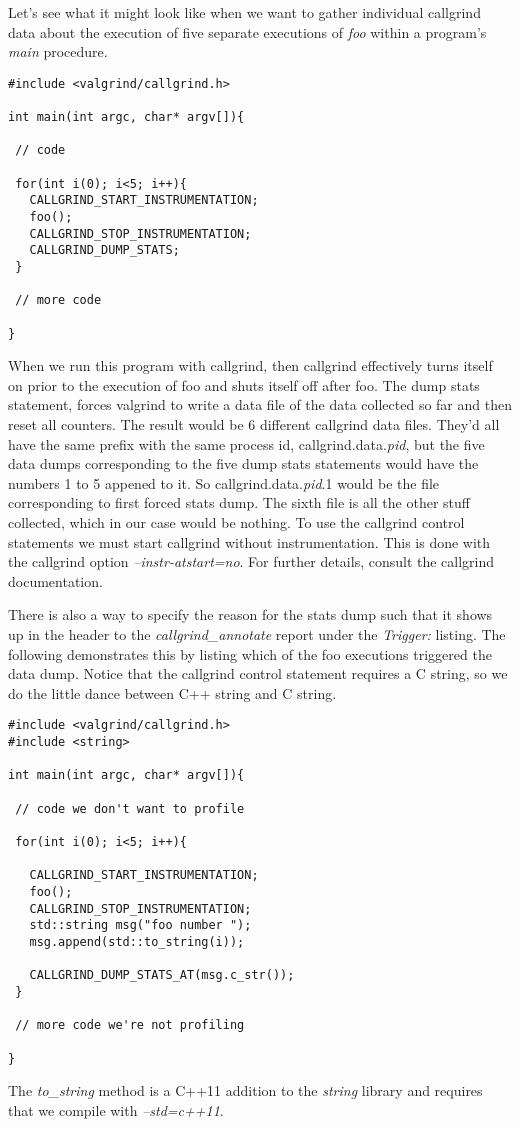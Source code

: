 \documentclass[]{tufte-handout}
\begin{document}
Let's see what it might look like when we want to gather individual callgrind data about the execution of five separate executions of \textit{foo} within a program's \textit{main} procedure.
\begin{verbatim}
#include <valgrind/callgrind.h>

int main(int argc, char* argv[]){
 
 // code
 
 for(int i(0); i<5; i++){
   CALLGRIND_START_INSTRUMENTATION;
   foo();
   CALLGRIND_STOP_INSTRUMENTATION;
   CALLGRIND_DUMP_STATS;
 }

 // more code

}

\end{verbatim} 
When we run this program with callgrind, then callgrind effectively turns itself on prior to the execution of foo and shuts itself off after foo. The dump stats statement, forces valgrind to write a data file of the data collected so far and then  reset all counters. The result would be 6 different callgrind data files. They'd all have the same prefix with the same process id, callgrind.data.\textit{pid}, but the five data dumps corresponding to the five dump stats statements would have the numbers 1 to 5 appened to it. So callgrind.data.\textit{pid}.1 would be the file corresponding to first forced stats dump. The sixth file is all the other stuff collected, which in our case would be nothing. To use the callgrind control statements we must start callgrind without instrumentation. This is done with the callgrind option \textit{--instr-atstart=no}. For further details, consult the callgrind documentation. 

There is also a way to specify the reason for the stats dump such that it shows up in the header to the \textit{callgrind\_annotate} report under the \textit{Trigger:} listing.  The following demonstrates this by listing which of the foo executions triggered the data dump. Notice that the callgrind control statement requires a C string, so we do the little dance between C++ string and C string.
\begin{verbatim}
#include <valgrind/callgrind.h>
#include <string>

int main(int argc, char* argv[]){
 
 // code we don't want to profile
 
 for(int i(0); i<5; i++){
  
   CALLGRIND_START_INSTRUMENTATION;
   foo();
   CALLGRIND_STOP_INSTRUMENTATION;
   std::string msg("foo number ");
   msg.append(std::to_string(i));  
    
   CALLGRIND_DUMP_STATS_AT(msg.c_str());
 }

 // more code we're not profiling

}
\end{verbatim}
The \textit{to\_string} method is a C++11 addition to the \textit{string} library and requires that we compile with \textit{--std=c++11}.
 
\end{document}
